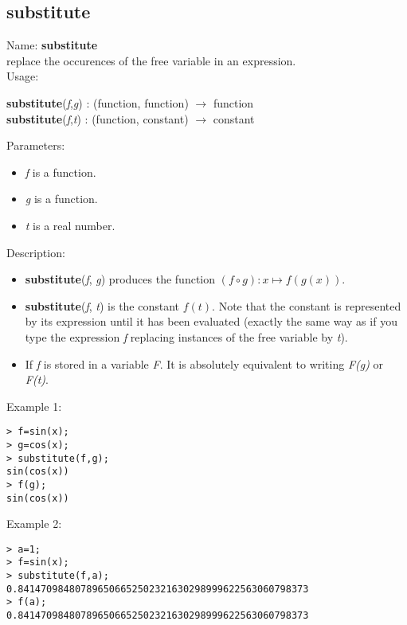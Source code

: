 \subsection{substitute}
\label{labsubstitute}
\noindent Name: \textbf{substitute}\\
replace the occurences of the free variable in an expression.\\

\noindent Usage: 
\begin{center}
\textbf{substitute}(\emph{f},\emph{g}) : (\textsf{function}, \textsf{function}) $\rightarrow$ \textsf{function}\\
\textbf{substitute}(\emph{f},\emph{t}) : (\textsf{function}, \textsf{constant}) $\rightarrow$ \textsf{constant}\\
\end{center}
Parameters: 
\begin{itemize}
\item \emph{f} is a function.
\item \emph{g} is a function.
\item \emph{t} is a real number.
\end{itemize}
\noindent Description: \begin{itemize}

\item \textbf{substitute}(\emph{f}, \emph{g}) produces the function $(f \circ g) : x \mapsto f(g(x))$.

\item \textbf{substitute}(\emph{f}, \emph{t}) is the constant $f(t)$. Note that the constant is
   represented by its expression until it has been evaluated (exactly the same
   way as if you type the expression \emph{f} replacing instances of the free variable 
   by \emph{t}).

\item If \emph{f} is stored in a variable \emph{F}. It is absolutely equivalent to 
   writing \emph{F(g)} or \emph{F(t)}.
\end{itemize}
\noindent Example 1: 
\begin{center}\begin{minipage}{15cm}\begin{Verbatim}[frame=single]
> f=sin(x);
> g=cos(x);
> substitute(f,g);
sin(cos(x))
> f(g);
sin(cos(x))
\end{Verbatim}
\end{minipage}\end{center}
\noindent Example 2: 
\begin{center}\begin{minipage}{15cm}\begin{Verbatim}[frame=single]
> a=1;
> f=sin(x);
> substitute(f,a);
0.841470984807896506652502321630298999622563060798373
> f(a);
0.841470984807896506652502321630298999622563060798373
\end{Verbatim}
\end{minipage}\end{center}
